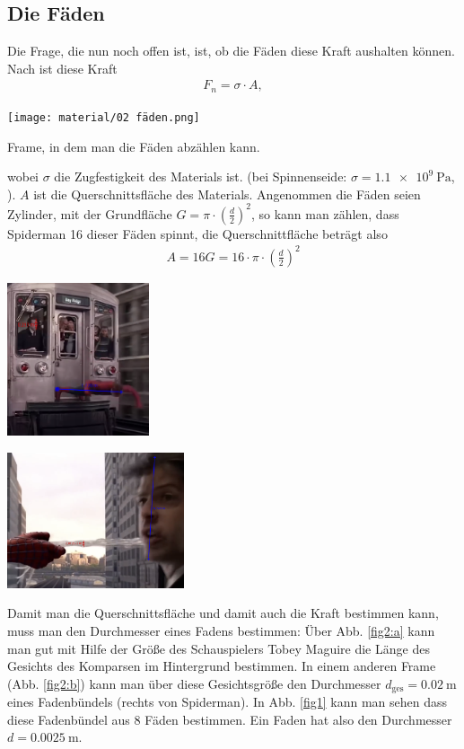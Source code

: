 \documentclass[a4paper, 11pt, nofonts, 
twoside, sfsidenotes, nobib, justified]{tufte-handout}
\begin{document}
\subsection{Die Fäden}
Die Frage, die nun noch offen ist, ist, ob die Fäden diese Kraft aushalten können. Nach \cite{WSem07} ist diese Kraft 
\begin{align}
	F_n=\sigma \cdot A,
\end{align}
\begin{marginfigure}
	\centering
	\texttt{[image: material/02 fäden.png]}
	\caption{Frame, in dem man die Fäden abzählen kann.}
	\label{fig1}
\end{marginfigure}
wobei $\sigma$ die Zugfestigkeit des Materials ist. (bei Spinnenseide: $\sigma = \SI{1.1e9}{\pascal}$, \cite{WSem08}). $A$ ist die Querschnittsfläche des Materials. Angenommen die Fäden seien Zylinder, mit der Grundfläche $G=\pi\cdot (\frac d2)^2$, so kann man zählen, dass Spiderman 16 dieser Fäden spinnt, die Querschnittfläche beträgt also 
\begin{align}
	A=16G=16\cdot \pi\cdot \left(\frac d2\right)^2
\end{align}
\newpage
\begin{marginfigure}
	\centering
	\includegraphics[height = 4.5cm]{material/05 gersicht.png}
	\caption{}
	\label{fig2:a}
\end{marginfigure}
\begin{marginfigure}
	\centering
	\vspace{.5cm}
	\includegraphics[height =4cm]{material/06 faden neu.png}
	\caption{}
	\label{fig2:b}
\end{marginfigure}
Damit man die Querschnittsfläche und damit auch die Kraft bestimmen kann, muss man den Durchmesser eines Fadens bestimmen: Über Abb. \ref{fig2:a} kann man gut mit Hilfe der Größe des Schauspielers Tobey Maguire \cite{WSem11} die Länge des Gesichts des Komparsen im Hintergrund bestimmen. In einem anderen Frame (Abb. \ref{fig2:b}) kann man über diese Gesichtsgröße den Durchmesser $d_\text{ges}=\SI{0.02}{\meter}$ eines Fadenbündels (rechts von Spiderman). In Abb. \ref{fig1} kann man sehen dass diese Fadenbündel aus 8 Fäden bestimmen. Ein Faden hat also den Durchmesser $d=\SI{0.0025}{\meter}$. \\
\end{document}

